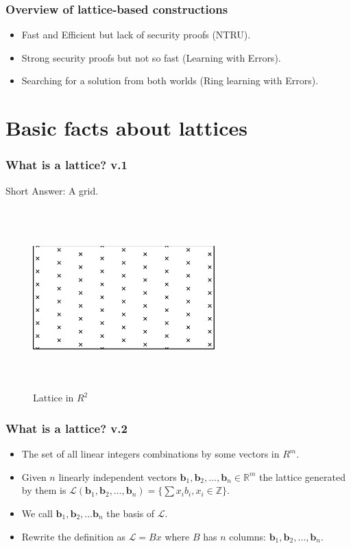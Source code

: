 \documentclass{beamer}
\begin{document}
\begin{frame}
    \frametitle{Overview of lattice-based constructions}
    \begin{itemize}
        \item Fast and Efficient but lack of security proofs (NTRU).
        \pause \item Strong security proofs but not so fast (Learning with Errors).
        \pause \item Searching for a solution from both worlds (Ring learning with Errors).
    \end{itemize}
\end{frame}


\section{Basic facts about lattices}
\begin{frame}
    \frametitle{What is a lattice? v.1}
     {
        Short Answer: A grid.
        \begin{figure}
            \includegraphics[width=7cm,height=7cm,keepaspectratio]{img/latticer2.png}
            \caption{Lattice in $R^2$}
        \end{figure}
    }
\end{frame}

%

\begin{frame}
    \frametitle{What is a lattice? v.2}
    \begin{itemize}
        \item The set of all linear integers combinations by some vectors in $R^m$.
        \pause \item Given $n$ linearly independent vectors $\mathbf{b}_1, \mathbf{b}_2, \dots, \mathbf{b}_n \in \mathbb{R}^m$ the lattice generated by them is $\mathcal{L}(\mathbf{b}_1, \mathbf{b}_2, \dots, \mathbf{b}_n) = \{ \sum\nolimits{}{x_ib_i} , x_i \in \mathbb{Z}\}$.
        \pause \item We call $\mathbf{b}_1, \mathbf{b}_2, \dots \mathbf{b}_n$ the basis of $\mathcal{L}$.
        \pause \item Rewrite the definition as $\mathcal{L} = Bx$ where $B$ has $n$ columns: $\mathbf{b}_1, \mathbf{b}_2, \dots, \mathbf{b}_n$.

    \end{itemize}
\end{frame}
\end{document}
